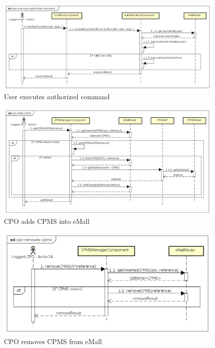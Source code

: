 \begin{figure}[!h]
    \begin{center}
        \includegraphics[keepaspectratio, width=16cm]{Sequence/user-executes-authorized-command.png}
        \caption{User executes authorized command}
        \label{fig:user-executes-authorized-command}
    \end{center}
\end{figure}
\begin{figure}[!h]
    \begin{center}
        \includegraphics[keepaspectratio, width=16cm]{Sequence/cpo-adds-cpms.png}
        \caption{\ac{CPO} adds \ac{CPMS} into \ac{eMall}}
        \label{fig:cpo-adds-cpms}
    \end{center}
\end{figure}
\begin{figure}[!h]
    \begin{center}
        \includegraphics[keepaspectratio, width=16cm]{Sequence/cpo-removes-cpms.png}
        \caption{\ac{CPO} removes \ac{CPMS} from \ac{eMall}}
        \label{fig:cpo-removes-cpms}
    \end{center}
\end{figure}
